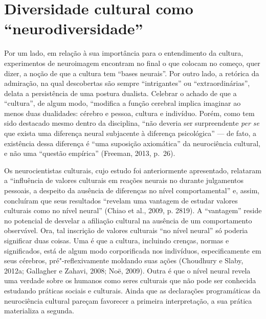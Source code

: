 \section{Diversidade cultural como ``neurodiversidade''}

Por um lado, em relação à sua importância para o entendimento da cultura,
experimentos de neuroimagem encontram no final o que colocam no começo, quer dizer,
a noção de que a cultura tem ``bases neurais''. Por
outro lado, a retórica da admiração, na qual descobertas são sempre
``intrigantes'' ou ``extraordinárias'', delata a persistência de uma
postura dualista. Celebrar o achado de que a ``cultura'', de algum modo,
``modifica a função cerebral implica imaginar ao menos duas dualidades:
cérebro e pessoa, cultura e indivíduo. Porém, como tem sido destacado
mesmo dentro da disciplina, ``não deveria ser surpreendente \emph{per
se} que exista uma diferença neural subjacente à diferença psicológica''
--- de fato, a existência dessa diferença é ``uma suposição axiomática''
da neurociência cultural, e não uma ``questão empírica'' (Freeman, 2013,
p.~26).

Os neurocientistas culturais, cujo estudo foi anteriormente apresentado,
relataram a ``influência de valores culturais em reações neurais no 
durante julgamentos pessoais, a despeito da ausência de diferenças no
nível comportamental'' e, assim, concluíram que seus resultados
``revelam uma vantagem de estudar valores culturais como  no nível
neural'' (Chiao et al., 2009, p. 2819). A ``vantagem'' reside no
potencial de desvelar a afiliação cultural na ausência de um
comportamento observável. Ora, tal inscrição de valores culturais ``no
nível neural'' só poderia significar duas coisas. Uma é que a cultura,
incluindo crenças, normas e significados, está de algum modo
corporificada nos indivíduos, especificamente em seus cérebros,
pré"-reflexivamente moldando suas ações (Choudhury e Slaby, 2012a;
Gallagher e Zahavi, 2008; Noë, 2009). Outra é que o nível neural revela
uma verdade sobre os humanos como seres culturais que não pode ser
conhecida estudando práticas sociais e culturais. Ainda que as
declarações programáticas da neurociência cultural pareçam favorecer a
primeira interpretação, a sua prática materializa a segunda.

